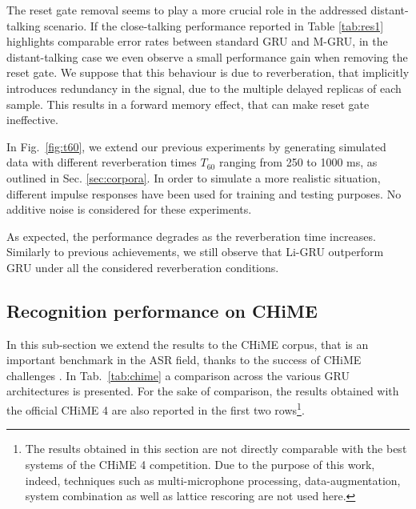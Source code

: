 \documentclass[journal]{IEEEtran}
\begin{document}
The reset gate removal seems to play a more crucial role in the addressed distant-talking scenario.  If the close-talking performance reported in Table \ref{tab:res1} highlights comparable error rates between standard GRU and M-GRU, in the distant-talking case we even observe a  small performance gain when removing the reset gate. We suppose that this behaviour is due to reverberation, that implicitly introduces redundancy in the signal, due to the multiple delayed replicas of each sample. This results in a forward memory effect, that can make reset gate ineffective. 

In Fig.~\ref{fig:t60}, we extend our previous experiments by generating simulated data with different reverberation times $T_{60}$ ranging from 250 to 1000 ms, as outlined in Sec. \ref{sec:corpora}. In order to simulate a more realistic situation, different impulse responses have been used for training and testing purposes. No additive noise is considered for these experiments.

As expected, the performance degrades as the reverberation time increases. Similarly to previous achievements, we still observe that Li-GRU outperform GRU under all the considered reverberation conditions. %

\subsection{Recognition performance on CHiME} \label{sec:chime}
In this sub-section we extend the results to the CHiME corpus, that is an important benchmark in the ASR field, thanks to the success of CHiME challenges \cite{chime,chime3}. In Tab.~\ref{tab:chime} a comparison across the various GRU architectures is presented. For the sake of comparison, the results obtained with the official CHiME 4 are also reported in the first two rows\footnote{The results obtained in this section are not directly comparable with the best systems of the CHiME 4 competition. Due to the purpose of this work, indeed, techniques such as multi-microphone processing, data-augmentation, system combination as well as lattice rescoring are not used here.}. 
\end{document}
